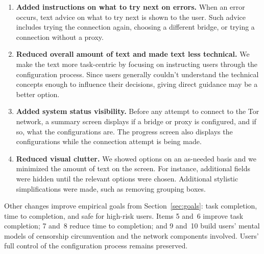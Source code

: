 \documentclass[USenglish,oneside,twocolumn]{article}
\begin{document}
\begin{enumerate}
\item {\bfseries Added instructions on what to try next on errors.} When an error occurs, text advice on what to try next is shown to the user. Such advice includes trying the connection again, choosing a different bridge, or trying a connection without a proxy. 
\item {\bfseries Reduced overall amount of text and made text less technical.} We make the text more task-centric by focusing on instructing users through the configuration process. Since users generally couldn't understand the technical concepts enough to influence their decisions, giving direct guidance may be a better option. 
\item {\bfseries Added system status visibility.} Before any attempt to connect to the Tor network, a summary screen displays if a bridge or proxy is configured, and if so, what the configurations are. The progress screen also displays the configurations while the connection attempt is being made. 
\item {\bfseries Reduced visual clutter.} We showed options on an as-needed basis and we minimized the amount of text on the screen. For instance, additional fields were hidden until the relevant options were chosen. Additional stylistic simplifications were made, such as removing grouping boxes. 
\end{enumerate} 

Other changes improve empirical goals from Section~\ref{sec:goals}: task completion, time to completion, and safe for high-risk users. Items 5 and~6 improve task completion; 7 and~8 reduce time to completion; and 9 and~10 build users' mental models of censorship circumvention and the network components involved. Users' full control of the configuration process remains preserved.\\ 
\end{document}
